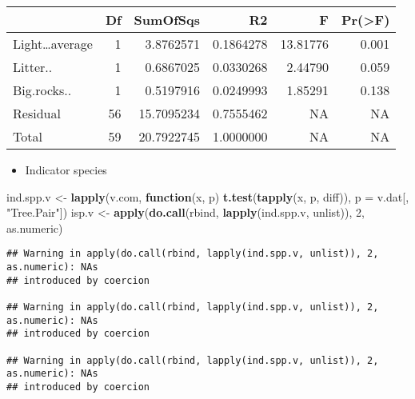 \documentclass[]{article}
\newenvironment{Shaded}{\begin{snugshade}}{\end{snugshade}}
\newcommand{\KeywordTok}[1]{\textcolor[rgb]{0.13,0.29,0.53}{\textbf{#1}}}
\newcommand{\DataTypeTok}[1]{\textcolor[rgb]{0.13,0.29,0.53}{#1}}
\newcommand{\DecValTok}[1]{\textcolor[rgb]{0.00,0.00,0.81}{#1}}
\newcommand{\StringTok}[1]{\textcolor[rgb]{0.31,0.60,0.02}{#1}}
\newcommand{\ControlFlowTok}[1]{\textcolor[rgb]{0.13,0.29,0.53}{\textbf{#1}}}
\newcommand{\NormalTok}[1]{#1}
\providecommand{\tightlist}{%
  \setlength{\itemsep}{0pt}\setlength{\parskip}{0pt}}
\begin{document}
\begin{longtable}[]{@{}lrrrrr@{}}
\toprule
& Df & SumOfSqs & R2 & F & Pr(\textgreater{}F)\tabularnewline
\midrule
\endhead
Light\ldots{}average & 1 & 3.8762571 & 0.1864278 & 13.81776 &
0.001\tabularnewline
Litter.. & 1 & 0.6867025 & 0.0330268 & 2.44790 & 0.059\tabularnewline
Big.rocks.. & 1 & 0.5197916 & 0.0249993 & 1.85291 & 0.138\tabularnewline
Residual & 56 & 15.7095234 & 0.7555462 & NA & NA\tabularnewline
Total & 59 & 20.7922745 & 1.0000000 & NA & NA\tabularnewline
\bottomrule
\end{longtable}

\begin{itemize}
\tightlist
\item
  Indicator species
\end{itemize}

\begin{Shaded}
\begin{Highlighting}[]
\NormalTok{ind.spp.v <-}\StringTok{ }\KeywordTok{lapply}\NormalTok{(v.com, }\ControlFlowTok{function}\NormalTok{(x, p) }\KeywordTok{t.test}\NormalTok{(}\KeywordTok{tapply}\NormalTok{(x, p, diff)), }
                    \DataTypeTok{p =}\NormalTok{ v.dat[, }\StringTok{"Tree.Pair"}\NormalTok{])}
\NormalTok{isp.v <-}\StringTok{ }\KeywordTok{apply}\NormalTok{(}\KeywordTok{do.call}\NormalTok{(rbind, }\KeywordTok{lapply}\NormalTok{(ind.spp.v, unlist)), }\DecValTok{2}\NormalTok{, as.numeric)}
\end{Highlighting}
\end{Shaded}

\begin{verbatim}
## Warning in apply(do.call(rbind, lapply(ind.spp.v, unlist)), 2, as.numeric): NAs
## introduced by coercion

## Warning in apply(do.call(rbind, lapply(ind.spp.v, unlist)), 2, as.numeric): NAs
## introduced by coercion

## Warning in apply(do.call(rbind, lapply(ind.spp.v, unlist)), 2, as.numeric): NAs
## introduced by coercion
\end{verbatim}
\end{document}
